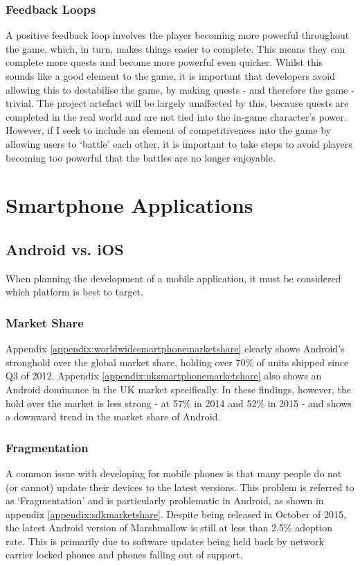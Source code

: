 \subsubsection{Feedback Loops}
A positive feedback loop involves the player becoming more powerful throughout the game, which, in turn, makes things easier to complete. This means they can complete more quests and become more powerful even quicker.
Whilst this sounds like a good element to the game, it is important that developers avoid allowing this to destabilise the game, by making quests - and therefore the game - trivial.
The project artefact will be largely unaffected by this, because quests are completed in the real world and are not tied into the in-game character's power. 
However, if I seek to include an element of competitiveness into the game by allowing users to `battle' each other, it is important to take steps to avoid players becoming too powerful that the battles are no longer enjoyable.

\section{Smartphone Applications}
\subsection{Android vs. iOS}
When planning the development of a mobile application, it must be considered which platform is best to target. 

\subsubsection{Market Share}
Appendix \ref{appendix:worldwidesmartphonemarketshare} clearly shows Android's stronghold over the global market share, holding over 70\% of units shipped since Q3 of 2012. 
Appendix \ref{appendix:uksmartphonemarketshare} also shows an Android dominance in the UK market specifically. 
In these findings, however, the hold over the market is less strong - at 57\% in 2014 and 52\% in 2015 - and shows a downward trend in the market share of Android.

\subsubsection{Fragmentation}
A common issue with developing for mobile phones is that many people do not (or cannot) update their devices to the latest versions.
This problem is referred to as `Fragmentation' and is particularly problematic in Android, as shown in appendix \ref{appendix:sdkmarketshare}.
Despite being released in October of 2015, the latest Android version of Marshmallow is still at less than 2.5\% adoption rate. 
This is primarily due to software updates being held back by network carrier locked phones and phones falling out of support.

